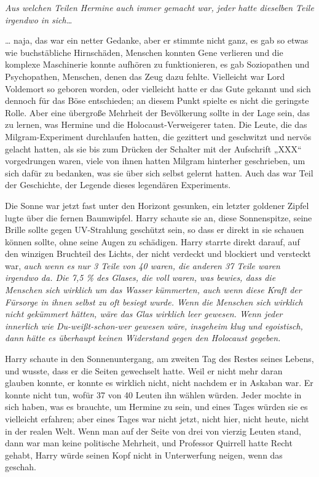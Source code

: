 {\emph{Aus welchen Teilen Hermine auch immer gemacht war, jeder hatte dieselben Teile irgendwo in sich…}

… naja, das war ein netter Gedanke, aber er stimmte nicht ganz, es gab so etwas wie buchstäbliche Hirnschäden, Menschen konnten Gene verlieren und die komplexe Maschinerie konnte aufhören zu funktionieren, es gab Soziopathen und Psychopathen, Menschen, denen das Zeug dazu fehlte. Vielleicht war Lord Voldemort so geboren worden, oder vielleicht hatte er das Gute gekannt und sich dennoch für das Böse entschieden; an diesem Punkt spielte es nicht die geringste Rolle. Aber eine übergroße Mehrheit der Bevölkerung sollte in der Lage sein, das zu lernen, was Hermine und die Holocaust-Verweigerer taten. Die Leute, die das Milgram-Experiment durchlaufen hatten, die gezittert und geschwitzt und nervös gelacht hatten, als sie bis zum Drücken der Schalter mit der Aufschrift „XXX“ vorgedrungen waren, viele von ihnen hatten Milgram hinterher geschrieben, um sich dafür zu bedanken, was sie über sich selbst gelernt hatten. Auch das war Teil der Geschichte, der Legende dieses legendären Experiments.

Die Sonne war jetzt fast unter den Horizont gesunken, ein letzter goldener Zipfel lugte über die fernen Baumwipfel. Harry schaute sie an, diese Sonnenspitze, seine Brille sollte gegen UV-Strahlung geschützt sein, so dass er direkt in sie schauen können sollte, ohne seine Augen zu schädigen. Harry starrte direkt darauf, auf den winzigen Bruchteil des Lichts, der nicht verdeckt und blockiert und versteckt war, \emph{auch wenn es nur 3 Teile von 40 waren, die anderen 37 Teile waren irgendwo da. Die 7,5 \% des Glases, die voll waren, was bewies, dass die Menschen sich wirklich um das Wasser kümmerten, auch wenn diese Kraft der Fürsorge in ihnen selbst zu oft besiegt wurde. Wenn die Menschen sich wirklich nicht gekümmert hätten, wäre das Glas wirklich leer gewesen. Wenn jeder innerlich wie Du-weißt-schon-wer gewesen wäre, insgeheim klug und egoistisch, dann hätte es überhaupt keinen Widerstand gegen den Holocaust gegeben.}

Harry schaute in den Sonnenuntergang, am zweiten Tag des Restes seines Lebens, und wusste, dass er die Seiten gewechselt hatte. Weil er nicht mehr daran glauben konnte, er konnte es wirklich nicht, nicht nachdem er in Askaban war. Er konnte nicht tun, wofür 37 von 40 Leuten ihn wählen würden. Jeder mochte in sich haben, was es brauchte, um Hermine zu sein, und eines Tages würden sie es vielleicht erfahren; aber eines Tages war nicht jetzt, nicht hier, nicht heute, nicht in der realen Welt. Wenn man auf der Seite von drei von vierzig Leuten stand, dann war man keine politische Mehrheit, und Professor Quirrell hatte Recht gehabt, Harry würde seinen Kopf nicht in Unterwerfung neigen, wenn das geschah.

}
